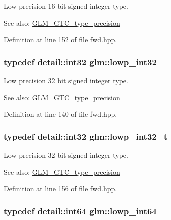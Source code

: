Low precision 16 bit signed integer type. \begin{Desc}
\item[See also:]\hyperlink{group__gtc__type__precision}{GLM\_\-GTC\_\-type\_\-precision} \end{Desc}


Definition at line 152 of file fwd.hpp.\hypertarget{group__gtc__type__precision_gd9939c9d6fec1c6accc02a83c6500f08}{
\subsubsection[lowp\_\-int32]{\setlength{\rightskip}{0pt plus 5cm}typedef detail::int32 {\bf glm::lowp\_\-int32}}}
\label{group__gtc__type__precision_gd9939c9d6fec1c6accc02a83c6500f08}


Low precision 32 bit signed integer type. \begin{Desc}
\item[See also:]\hyperlink{group__gtc__type__precision}{GLM\_\-GTC\_\-type\_\-precision} \end{Desc}


Definition at line 140 of file fwd.hpp.\hypertarget{group__gtc__type__precision_gd9567c806dc39f534174eef42663119d}{
\subsubsection[lowp\_\-int32\_\-t]{\setlength{\rightskip}{0pt plus 5cm}typedef detail::int32 {\bf glm::lowp\_\-int32\_\-t}}}
\label{group__gtc__type__precision_gd9567c806dc39f534174eef42663119d}


Low precision 32 bit signed integer type. \begin{Desc}
\item[See also:]\hyperlink{group__gtc__type__precision}{GLM\_\-GTC\_\-type\_\-precision} \end{Desc}


Definition at line 156 of file fwd.hpp.\hypertarget{group__gtc__type__precision_gb8a8e75af347592406e41b3ae2c0712b}{
\subsubsection[lowp\_\-int64]{\setlength{\rightskip}{0pt plus 5cm}typedef detail::int64 {\bf glm::lowp\_\-int64}}}
\label{group__gtc__type__precision_gb8a8e75af347592406e41b3ae2c0712b}


